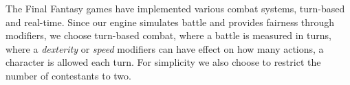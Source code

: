 The Final Fantasy games have implemented various combat systems, turn-based and real-time.
Since our engine simulates battle and provides fairness through modifiers, we choose turn-based combat, where a battle is measured in turns, where a \emph{dexterity} or \emph{speed} modifiers can have effect on how many actions, a character is allowed each turn.
For simplicity we also choose to restrict the number of contestants to two.



